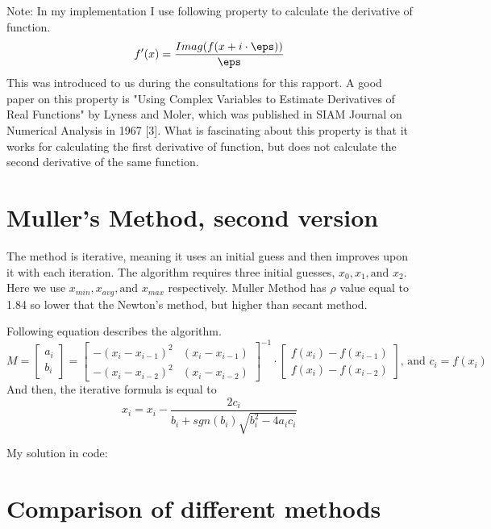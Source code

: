 \documentclass[11pt]{article}
\begin{document}
Note: In my implementation I use following property to calculate the derivative of function.
$$f'(x) = \frac{Imag(f(x + i\cdot \eps))}{\eps}$$
This was introduced to us during the consultations for this rapport. A good
paper on this property is "Using Complex Variables to Estimate Derivatives of
Real Functions" by Lyness and Moler, which was published in SIAM Journal on
Numerical Analysis in 1967 [3]. What is fascinating about this property is that
it works for calculating the first derivative of function, but does not
calculate the second derivative of the same function.

\newpage
\section{Muller's Method, second version}
The method is iterative, meaning it uses an initial guess and then improves
upon it with each iteration. The algorithm requires three initial guesses,
$x_0, x_1, \mbox{and } x_2$. Here we use $x_{min}, x_{avg}, \mbox{and }
x_{max}$ respectively. Muller Method has $\rho$ value equal to 1.84 so lower
that the Newton's method, but higher than secant method. 

Following equation describes the algorithm. 
$$ 
M = 
\begin{bmatrix} a_i \\ b_i \end{bmatrix} =
\begin{bmatrix} 
    -(x_i - x_{i-1})^2 & (x_i - x_{i-1}) \\
    -(x_i - x_{i-2})^2 & (x_i - x_{i-2})
\end{bmatrix}^{-1} \cdot 
\begin{bmatrix} 
    f(x_i) -f(x_{i-1}) \\
    f(x_i) -f(x_{i-2})
\end{bmatrix}
\mbox{, and } c_i = f(x_i)
$$
And then, the iterative formula is equal to 
$$x_i = x_i - \frac{2c_i}{b_i + sgn(b_i)\sqrt{b_i^2-4a_i c_i}}$$

My solution in code:


\newpage
\section{Comparison of different methods}
\end{document}
